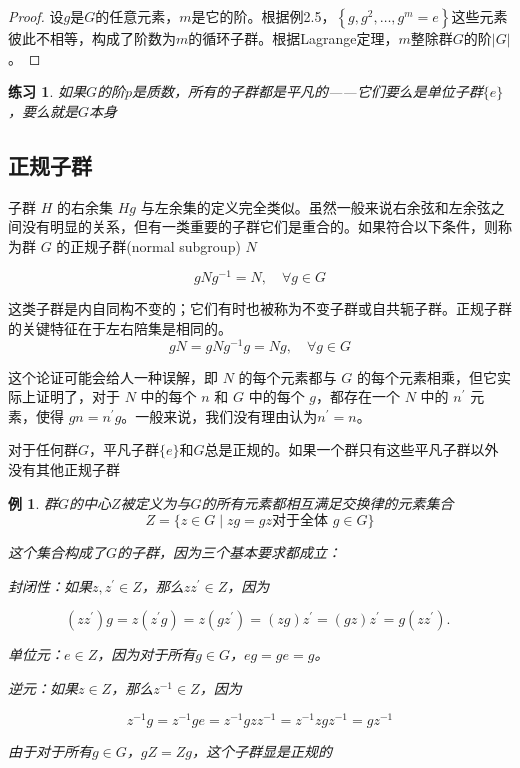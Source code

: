 \documentclass[hyperref,UTF8]{ctexbook}
\newtheorem{eg}{例}[chapter]
\newtheorem*{exercise}{练习}
\begin{document}
    \begin{proof}
        设$g$是$G$的任意元素，$m$是它的阶。根据例2.5，$\left\{g, g^{2}, \ldots, g^{m}=e\right\}$这些元素彼此不相等，构成了阶数为$m$的循环子群。根据Lagrange定理，$m$整除群$G$的阶$|G|$。
    \end{proof}
    
    \begin{exercise}
        如果$G$的阶$p$是质数，所有的子群都是平凡的——它们要么是单位子群$\{e\}$，要么就是$G$本身
    \end{exercise}
\subsection{正规子群}
子群 $H$ 的右余集 $H g$ 与左余集的定义完全类似。虽然一般来说右余弦和左余弦之间没有明显的关系，但有一类重要的子群它们是重合的。如果符合以下条件，则称为群 $G$ 的正规子群(normal subgroup) $N$

$$
g N g^{-1}=N, \quad \forall g \in G
$$

这类子群是内自同构不变的；它们有时也被称为不变子群或自共轭子群。正规子群的关键特征在于左右陪集是相同的。
$$
g N=g N g^{-1} g=N g, \quad \forall g \in G
$$

这个论证可能会给人一种误解，即 $N$ 的每个元素都与 $G$ 的每个元素相乘，但它实际上证明了，对于 $N$ 中的每个 $n$ 和 $G$ 中的每个 $g$，都存在一个 $N$ 中的 $n^{\prime}$ 元素，使得 $g n=n^{\prime} g$。一般来说，我们没有理由认为$n^{\prime}=n$。

对于任何群$G$，平凡子群$\{e\}$和$G$总是正规的。如果一个群只有这些平凡子群以外没有其他正规子群
\begin{eg}
    群$G$的中心$Z$被定义为与$G$的所有元素都相互满足交换律的元素集合
    $$
Z=\{z \in G \mid z g=g z \text {对于全体 } g \in G\}
$$

这个集合构成了$G$的子群，因为三个基本要求都成立：

封闭性：如果$z, z^{\prime} \in Z$，那么$z z^{\prime} \in Z$，因为

$$
\left(z z^{\prime}\right) g=z\left(z^{\prime} g\right)=z\left(g z^{\prime}\right)=(z g) z^{\prime}=(g z) z^{\prime}=g\left(z z^{\prime}\right) \text {. }
$$

单位元：$e \in Z$，因为对于所有$g \in G$，$e g=g e=g$。

逆元：如果$z \in Z$，那么$z^{-1} \in Z$，因为

$$
z^{-1} g=z^{-1} g e=z^{-1} g z z^{-1}=z^{-1} z g z^{-1}=g z^{-1}
$$

由于对于所有$g \in G$，$g Z=Z g$，这个子群显是正规的
\end{eg}
\end{document}
